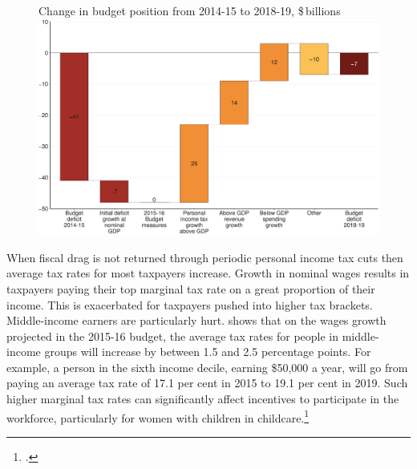 \begin{figure}
%
{Change in budget position from 2014-15 to 2018-19, \$\,billions}
\includegraphics[width=1.75\columnwidth]{Fiscal-challenges/figure/Figure3-1.pdf}
\end{figure}

When fiscal drag is not returned through periodic personal income tax cuts then average tax rates for most taxpayers increase. Growth in nominal wages results in taxpayers paying their top marginal tax rate on a great proportion of their income. This is exacerbated for taxpayers pushed into higher tax brackets. 
Middle-income earners are particularly hurt.  shows that on the wages growth projected in the 2015-16 budget, the average tax rates for people in middle-income groups will increase by between 1.5 and 2.5 percentage points. For example, a person in the sixth income decile, earning \$50,000 a year, will go from paying an average tax rate of 17.1 per cent in 2015 to 19.1 per cent in 2019. Such higher marginal tax rates can significantly affect incentives to participate in the workforce, particularly for women with children in childcare.\footcites[][11--12]{ProductivityCommission2015-Childcare}[][42--43]{DaleyMcGannonGinnivan2012}

